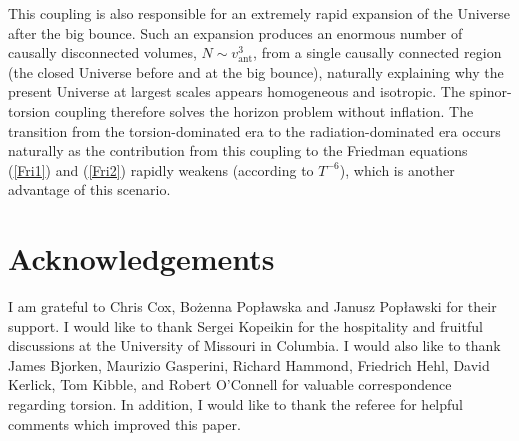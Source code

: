 \documentclass[prd,onecolumn,nofootinbib,showpacs]{revtex4}
\begin{document}
This coupling is also responsible for an extremely rapid expansion of the Universe after the big bounce.
Such an expansion produces an enormous number of causally disconnected volumes, $N\sim v^3_\textrm{ant}$, from a single causally connected region (the closed Universe before and at the big bounce), naturally explaining why the present Universe at largest scales appears homogeneous and isotropic.
The spinor-torsion coupling therefore solves the horizon problem without inflation.
The transition from the torsion-dominated era to the radiation-dominated era occurs naturally as the contribution from this coupling to the Friedman equations (\ref{Fri1}) and (\ref{Fri2}) rapidly weakens (according to $T^{-6}$), which is another advantage of this scenario.

\section*{Acknowledgements}
I am grateful to Chris Cox, Bo\.{z}enna Pop{\l}awska and Janusz Pop{\l}awski for their support.
I would like to thank Sergei Kopeikin for the hospitality and fruitful discussions at the University of Missouri in Columbia.
I would also like to thank James Bjorken, Maurizio Gasperini, Richard Hammond, Friedrich Hehl, David Kerlick, Tom Kibble, and Robert O'Connell for valuable correspondence regarding torsion.
In addition, I would like to thank the referee for helpful comments which improved this paper.
\end{document}
